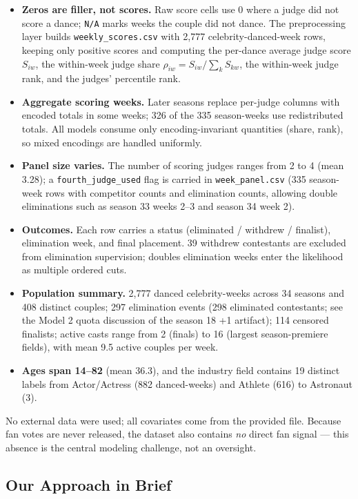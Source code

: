 \documentclass[10pt]{article}
\begin{document}
\begin{itemize}[itemsep=2pt]
\item \textbf{Zeros are filler, not scores.} Raw score cells use 0 where a judge did not
score a dance; \texttt{N/A} marks weeks the couple did not dance. The preprocessing layer
builds \texttt{weekly\_scores.csv} with 2{,}777 celebrity-danced-week rows, keeping only
positive scores and computing the per-dance average judge score $S_{iw}$, the within-week
judge share $\rho_{iw}=S_{iw}/\sum_k S_{kw}$, the within-week judge rank, and the judges'
percentile rank.
\item \textbf{Aggregate scoring weeks.} Later seasons replace per-judge columns with
encoded totals in some weeks; 326 of the 335 season-weeks use redistributed totals. All
models consume only encoding-invariant quantities (share, rank), so mixed encodings are
handled uniformly.
\item \textbf{Panel size varies.} The number of scoring judges ranges from 2 to 4
(mean 3.28); a \texttt{fourth\_judge\_used} flag is carried in \texttt{week\_panel.csv}
(335 season-week rows with competitor counts and elimination counts, allowing double
eliminations such as season 33 weeks 2--3 and season 34 week 2).
\item \textbf{Outcomes.} Each row carries a status (eliminated / withdrew / finalist),
elimination week, and final placement. 39 withdrew contestants are excluded from
elimination supervision; doubles elimination weeks enter the likelihood as multiple
ordered cuts.
\item \textbf{Population summary.} 2{,}777 danced celebrity-weeks across 34 seasons and
408 distinct couples; 297 elimination events (298 eliminated contestants; see the Model 2
quota discussion of the season 18 +1 artifact); 114 censored finalists; active casts range
from 2 (finals) to 16 (largest season-premiere fields), with mean 9.5 active couples per
week.
\item \textbf{Ages span 14--82} (mean 36.3), and the industry field contains 19 distinct
labels from Actor/Actress (882 danced-weeks) and Athlete (616) to Astronaut (3).
\end{itemize}

No external data were used; all covariates come from the provided file. Because fan votes
are never released, the dataset also contains \emph{no} direct fan signal --- this absence
is the central modeling challenge, not an oversight.

\subsection{Our Approach in Brief}
\label{sec:modelintro}
\end{document}
